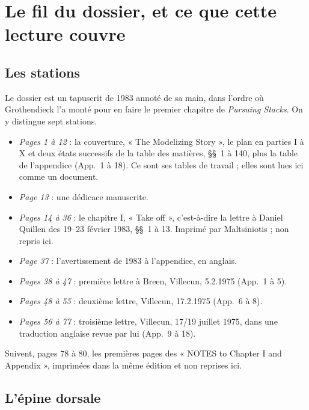 \documentclass[11pt,a4paper]{article}
\begin{document}
\section*{Le fil du dossier, et ce que cette lecture couvre}

\subsection*{Les stations}

Le dossier est un tapuscrit de 1983 annoté de sa main, dans l'ordre où
Grothendieck l'a monté pour en faire le premier chapitre de \emph{Pursuing
Stacks}. On y distingue sept stations.

\begin{itemize}
  \item[1.] \emph{Pages 1 à 12} : la couverture, « The Modelizing Story », le
  plan en parties I à X et deux états successifs de la table des matières,
  §§~1 à 140, plus la table de l'appendice (App.~1 à 18). Ce sont ses tables
  de travail ; elles sont lues ici comme un document.
  \item[2.] \emph{Page 13} : une dédicace manuscrite.
  \item[3.] \emph{Pages 14 à 36} : le chapitre I, « Take off », c'est-à-dire
  la lettre à Daniel Quillen des 19--23 février 1983, §§~1 à 13. Imprimé par
  Maltsiniotis ; non repris ici.
  \item[4.] \emph{Page 37} : l'avertissement de 1983 à l'appendice, en
  anglais.
  \item[5.] \emph{Pages 38 à 47} : première lettre à Breen, Villecun,
  5.2.1975 (App.~1 à 5).
  \item[6.] \emph{Pages 48 à 55} : deuxième lettre, Villecun, 17.2.1975
  (App.~6 à 8).
  \item[7.] \emph{Pages 56 à 77} : troisième lettre, Villecun, 17/19 juillet
  1975, dans une traduction anglaise revue par lui (App.~9 à 18).
\end{itemize}

Suivent, pages 78 à 80, les premières pages des « NOTES to Chapter I and
Appendix », imprimées dans la même édition et non reprises ici.

\subsection*{L'épine dorsale}
\end{document}
